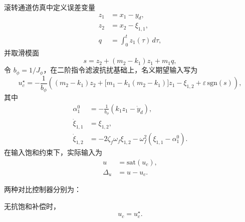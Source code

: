 滚转通道仿真中定义误差变量
\begin{subequations}\label{eq:ch5_sim_z}
\begin{align}
z_1&=x_1-y_d,\\
z_2&=x_2-\xi_{1,1},\\
q&=\int_0^t z_1(\tau)\,d\tau,
\end{align}
\end{subequations}
并取滑模面
\begin{equation}\label{eq:ch5_sim_s}
s=z_2+(m_2-k_1)z_1+m_1q,
\end{equation}
令 $b_{\phi}=1/J_{\phi}$，在二阶指令滤波抗扰基础上，名义期望输入写为
\begin{equation}\label{eq:ch5_sim_ucstar}
u_c^\star=-\frac{1}{b_{\phi}}\left((m_2-k_1)z_2+\bigl[m_1-k_1(m_2-k_1)\bigr]z_1-\xi_{1,2}+\varepsilon\,\mathrm{sgn}(s)\right),
\end{equation}
其中
\begin{subequations}
\begin{align}
\alpha_1^0 &= -\frac{1}{b_{\phi}}\left(k_1z_1-\dot y_d\right), \label{eq:ch5_sim_alpha1}\\
\dot \xi_{1,1} &= \xi_{1,2},\\
\dot \xi_{1,2}&=-2\zeta_f\omega_f\xi_{1,2}-\omega_f^2(\xi_{1,1}-\alpha_1^0). \label{eq:ch5_sim_filter}
\end{align}
\end{subequations}
在输入饱和约束下，实际输入为
\begin{subequations}\label{eq:ch5_sim_sat}
\begin{align}
u&=\mathrm{sat}(u_c),\\
\Delta_u&=u-u_c.
\end{align}
\end{subequations}

两种对比控制器分别为：

无抗饱和补偿时，
\begin{equation}\label{eq:ch5_sim_noaw}
u_c=u_c^\star.
\end{equation}

